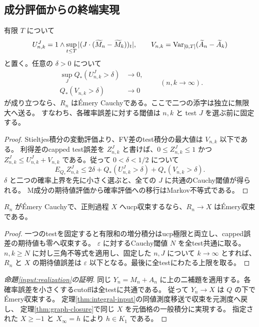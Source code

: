 \subsection{成分評価からの終端実現}
\label{sec:component-realization}
\begin{lemma}
有限 $T$ について
\[
 U^J_{n,k}=1\wedge\sup_{t\le T}|(J\cdot(\widetilde M_n-\widetilde M_k))_t|,
 \qquad V_{n,k}=\operatorname{Var}_{[0,T]}(\widetilde A_n-\widetilde A_k)
\]
と置く。任意の $\delta>0$ について
\[
 \begin{aligned}
 \sup_J Q_*(U^J_{n,k}>\delta)&\longrightarrow0,\\
 Q_*(V_{n,k}>\delta)&\longrightarrow0
 \end{aligned}
 \qquad(n,k\longrightarrow\infty).
\]
が成り立つなら、$R_n$ はÉmery Cauchyである。ここで二つの添字は独立に無限大へ送る。
すなわち、各確率誤差に対する閾値は $n,k$ と test $J$ を選ぶ前に固定する。
\end{lemma}
\begin{proof}
Stieltjes積分の変動評価より、FV差のtest積分の最大値は $V_{n,k}$ 以下である。
利得差のcapped test誤差を $Z^J_{n,k}$ と書けば、$0\leq Z^J_{n,k}\leq1$ かつ
$Z^J_{n,k}\leq U^J_{n,k}+V_{n,k}$ である。従って $0<\delta<1/2$ について
\[
 E_{Q_*}Z^J_{n,k}\leq2\delta+Q_*(U^J_{n,k}>\delta)+Q_*(V_{n,k}>\delta).
\]
$\delta$ と二つの確率上界を先に小さく選ぶと、全ての $J$ に共通のCauchy閾値が得られる。
M成分の期待値評価から確率評価への移行はMarkov不等式である。
\end{proof}

\begin{lemma}[同じ一様極限へのÉmery収束]
$R_n$ がÉmery Cauchyで、正則過程 $X$ へucp収束するなら、$R_n\to X$ はÉmery収束である。
\end{lemma}
\begin{proof}
一つのtestを固定すると有限和の増分積分はucp極限と両立し、capped誤差の期待値も零へ収束する。
$\varepsilon$ に対するCauchy閾値 $N$ を全test共通に取る。
$n,k\geq N$ に対し三角不等式を適用し、固定した $n,J$ について $k\to\infty$ とすれば、
$R_n$ と $X$ の期待値誤差は $\varepsilon$ 以下となる。最後に全testにわたる上限を取る。
\end{proof}


\begin{proof}[命題\ref{input:realization}の証明]
同じ $Y_n=M_n+A_n$ に上の二補題を適用する。各確率誤差を小さくするcutoffは全testに共通である。
従って $Y_n\to X$ は $Q$ の下でÉmery収束する。
定理\ref{thm:integral-input}の同値測度移送で収束を元測度へ戻し、
定理\ref{thm:graph-closure}で同じ $X$ を元価格の一般積分に実現する。
指定された $X\geq-1$ と $X_\infty=h$ により $h\in K_1$ である。
\end{proof}
